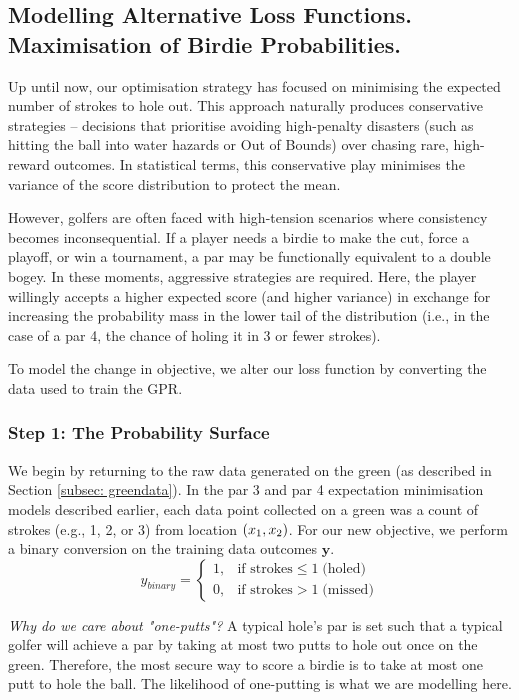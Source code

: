 \documentclass[11pt, letterpaper]{article}
\begin{document}
\subsection{Modelling Alternative Loss Functions. Maximisation of Birdie Probabilities.}
\label{subsec: par4b}

Up until now, our optimisation strategy has focused on minimising the expected number of strokes to hole out. This approach naturally produces conservative strategies – decisions that prioritise avoiding high-penalty disasters (such as hitting the ball into water hazards or Out of Bounds) over chasing rare, high-reward outcomes. In statistical terms, this conservative play minimises the variance of the score distribution to protect the mean.

However, golfers are often faced with high-tension scenarios where consistency becomes inconsequential. If a player needs a birdie to make the cut, force a playoff, or win a tournament, a par may be functionally equivalent to a double bogey. In these moments, aggressive strategies are required. Here, the player willingly accepts a higher expected score (and higher variance) in exchange for increasing the probability mass in the lower tail of the distribution (i.e., in the case of a par 4, the chance of holing it in 3 or fewer strokes).

To model the change in objective, we alter our loss function by converting the data used to train the GPR.

\subsubsection{Step 1: The Probability Surface}
We begin by returning to the raw data generated on the green (as described in Section \ref{subsec: greendata}). In the par 3 and par 4 expectation minimisation models described earlier, each data point collected on a green was a count of strokes (e.g., 1, 2, or 3) from location $(x_1, x_2)$. For our new objective, we perform a binary conversion on the training data outcomes $\mathbf{y}$. 
\[y_{binary} = \begin{cases}
1, & \text{if strokes} \le 1 \;\text{(holed)} \\
0, & \text{if strokes} > 1 \;\text{(missed)}
\end{cases}\]

\textit{Why do we care about "one-putts"?} A typical hole's par is set such that a typical golfer will achieve a par by taking at most two putts to hole out once on the green. Therefore, the most secure way to score a birdie is to take at most one putt to hole the ball. The likelihood of one-putting is what we are modelling here.
\end{document}

